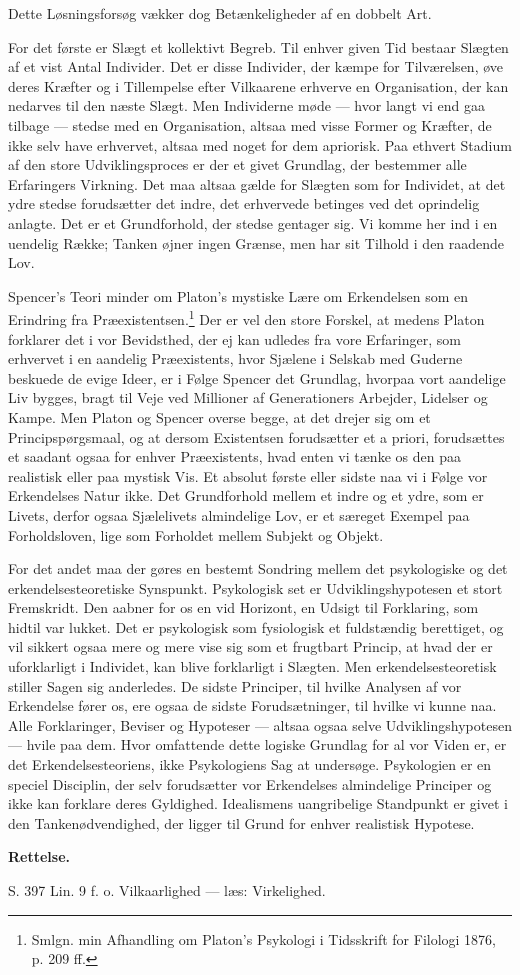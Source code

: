 \documentclass[12pt,a4paper,openany]{book}
\newcommand{\opage}[1]{\marginnote{\footnotesize\textit{[#1]}}}
\begin{document}
Dette Løsningsforsøg vækker dog Betænkeligheder af en dobbelt Art.

For det første er Slægt et kollektivt Begreb. Til enhver given Tid
bestaar Slægten af et vist Antal Individer. Det er disse Individer, der
kæmpe for Tilværelsen, øve deres Kræfter og i Tillempelse efter
Vilkaarene erhverve en Organisation, der kan nedarves til den næste
Slægt. Men Individerne møde --- hvor langt vi end gaa tilbage --- stedse
med en Organisation, altsaa med visse Former og Kræfter, de ikke selv
have erhvervet, altsaa med noget for dem apriorisk. Paa ethvert Stadium
af den store Udviklingsproces er der et givet Grundlag, der bestemmer
alle Erfaringers Virkning. Det maa altsaa gælde for Slægten som for
Individet, at det ydre stedse forudsætter det indre, det erhvervede
betinges ved det oprindelig anlagte. Det er et Grundforhold, der stedse
gentager sig. Vi komme her ind i en uendelig Række; Tanken øjner ingen
Grænse, men har sit Tilhold i den raadende Lov.

Spencer’s Teori minder om Platon’s mystiske Lære om Erkendelsen som en
Erindring fra Præexistentsen.\footnote[1]{Smlgn. min Afhandling om
Platon’s Psykologi i Tidsskrift for Filologi 1876, p. 209 ff.} Der er
\opage{412}vel den store Forskel, at medens Platon forklarer det i vor
Bevidsthed, der ej kan udledes fra vore Erfaringer, som erhvervet i en
aandelig Præexistents, hvor Sjælene i Selskab med Guderne beskuede de
evige Ideer, er i Følge Spencer det Grundlag, hvorpaa vort aandelige Liv
bygges, bragt til Veje ved Millioner af Generationers Arbejder, Lidelser
og Kampe. Men Platon og Spencer overse begge, at det drejer sig om et
Principspørgsmaal, og at dersom Existentsen forudsætter et a priori,
forudsættes et saadant ogsaa for enhver Præexistents, hvad enten vi
tænke os den paa realistisk eller paa mystisk Vis. Et absolut første
eller sidste naa vi i Følge vor Erkendelses Natur ikke. Det Grundforhold
mellem et indre og et ydre, som er Livets, derfor ogsaa Sjælelivets
almindelige Lov, er et særeget Exempel paa Forholdsloven, lige som
Forholdet mellem Subjekt og Objekt.

For det andet maa der gøres en bestemt Sondring mellem det psykologiske
og det erkendelsesteoretiske Synspunkt. Psykologisk set er
Udviklingshypotesen et stort Fremskridt. Den aabner for os en vid
Horizont, en Udsigt til Forklaring, som hidtil var lukket. Det er
psykologisk som fysiologisk et fuldstændig berettiget, og vil sikkert
ogsaa mere og mere vise sig som et frugtbart Princip, at hvad der er
uforklarligt i Individet, kan blive forklarligt i Slægten. Men
erkendelsesteoretisk stiller Sagen sig anderledes. De sidste Principer,
til hvilke Analysen af vor Erkendelse fører os, ere ogsaa de sidste
Forudsætninger, til hvilke vi kunne naa. Alle Forklaringer, Beviser og
Hypoteser --- altsaa ogsaa selve Udviklingshypotesen --- hvile paa dem.
Hvor omfattende dette logiske Grundlag for al vor Viden er, er det
Erkendelsesteoriens, ikke Psykologiens Sag at undersøge. Psykologien er
en speciel Disciplin, der selv forudsætter vor Erkendelses almindelige
Principer og ikke kan forklare deres Gyldighed. Idealismens uangribelige
Standpunkt er givet i den Tankenødvendighed, der ligger til Grund for
enhver realistisk Hypotese.

\clearpage
\begin{center}\textbf{Rettelse.}\end{center}
\noindent S. 397 Lin. 9 f. o. Vilkaarlighed --- læs: Virkelighed.
\end{document}
